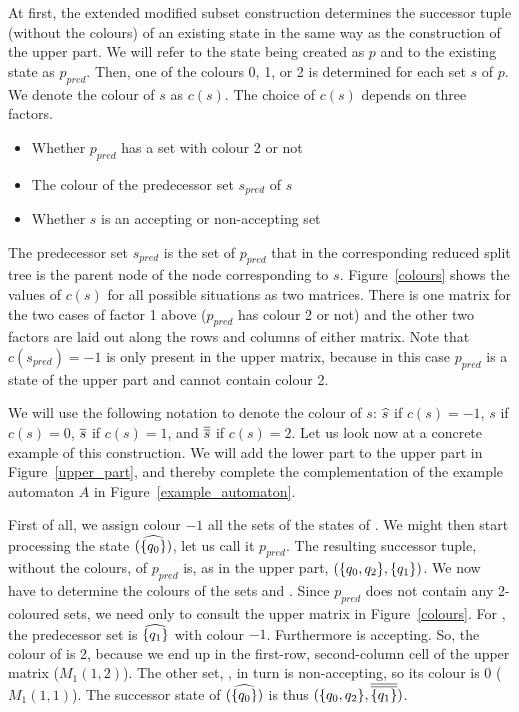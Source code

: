 At first, the extended modified subset construction determines the successor tuple (without the colours) of an existing state in the same way as the construction of the upper part. We will refer to the state being created as $p$ and to the existing state as $p_{pred}$. Then, one of the colours 0, 1, or 2 is determined for each set $s$ of $p$. We denote the colour of $s$ as $c(s)$. The choice of $c(s)$ depends on three factors.
\begin{itemize}
\item Whether $p_{pred}$ has a set with colour 2 or not
\item The colour of the predecessor set $s_{pred}$ of $s$
\item Whether $s$ is an accepting or non-accepting set
\end{itemize}
The predecessor set $s_{pred}$ is the set of $p_{pred}$ that in the corresponding reduced split tree is the parent node of the node corresponding to $s$. Figure~\ref{colours} shows the values of $c(s)$ for all possible situations as two matrices. There is one matrix for the two cases of factor 1 above ($p_{pred}$ has colour 2 or not) and the other two factors are laid out along the rows and columns of either matrix. Note that $c(s_{pred}) = -1$ is only present in the upper matrix, because in this case $p_{pred}$ is a state of the upper part and cannot contain colour 2.



We will use the following notation to denote the colour of $s$: $\cl^{s}$ if $c(s) = -1$, $s$ if $c(s) = 0$, $\cl1{s}$ if $c(s) = 1$, and $\cl2{s}$ if $c(s) = 2$. Let us look now at a concrete example of this construction. We will add the lower part to the upper part \Bp in Figure~\ref{upper_part}, and thereby complete the complementation of the example automaton $A$ in Figure~\ref{example_automaton}.

First of all, we assign colour $-1$ all the sets of the states of \Bp. We might then start processing the state $(\cl^{\qm0})$, let us call it $p_{pred}$. The resulting successor tuple, without the colours, of $p_{pred}$ is, as in the upper part, $(\{q_{0},q_{2}\},\{q_{1}\})$. We now have to determine the colours of the sets  and . Since $p_{pred}$ does not contain any 2-coloured sets, we need only to consult the upper matrix in Figure~\ref{colours}. For , the predecessor set is $\cl^{\qm1}$ with colour $-1$. Furthermore  is accepting. So, the colour of  is 2, because we end up in the first-row, second-column cell of the upper matrix ($M_1(1,2)$). The other set, , in turn is non-accepting, so its colour is 0 ($M_1(1,1)$). The successor state of $(\cl^{\qm0})$ is thus $(\qqm02,\cl2{\qm1})$.

